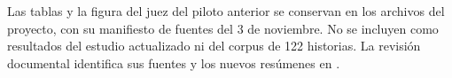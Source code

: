 Las tablas y la figura del juez del piloto anterior se conservan en los archivos del proyecto,
con su manifiesto de fuentes del 3 de noviembre. No se incluyen como resultados del estudio
actualizado ni del corpus de 122 historias. La revisión documental identifica sus fuentes y los
nuevos resúmenes en .
